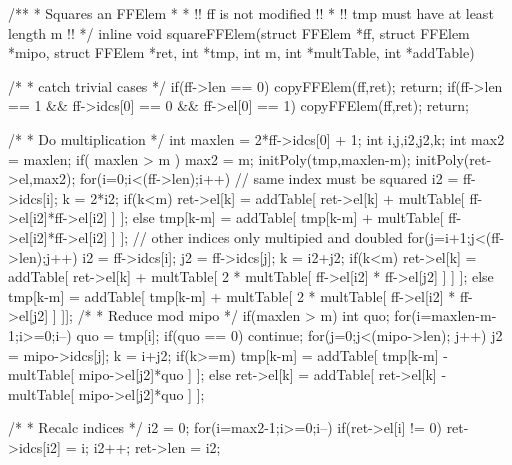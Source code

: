 \begin{ccode}[caption={Aus \url{../Sage/enumeratePCNs.c}},
  firstnumber=404]
/**
 * Squares an FFElem
 *
 * !! ff is not modified !!
 * !! tmp must have at least length m !!
 */
inline void squareFFElem(struct FFElem *ff, struct FFElem *mipo,
        struct FFElem *ret, int *tmp, int m,
        int *multTable, int *addTable){
    /* 
     * catch trivial cases
     */
    if(ff->len == 0){
        copyFFElem(ff,ret);
        return;
    }
    if(ff->len == 1 && ff->idcs[0] == 0 && ff->el[0] == 1){
        copyFFElem(ff,ret);
        return;
    }

    /*
     * Do multiplication
     */
    int maxlen = 2*ff->idcs[0] + 1;
    int i,j,i2,j2,k;
    int max2 = maxlen;
    if( maxlen > m ){
        max2 = m;
        initPoly(tmp,maxlen-m);
    }
    initPoly(ret->el,max2);
    for(i=0;i<(ff->len);i++){
        // same index must be squared
        i2 = ff->idcs[i];
        k = 2*i2;
        if(k<m){
            ret->el[k] = addTable[ ret->el[k] + 
                multTable[ ff->el[i2]*ff->el[i2] ] ];
        }else{
            tmp[k-m] = addTable[ tmp[k-m] +
                multTable[ ff->el[i2]*ff->el[i2] ] ];
        }
        // other indices only multipied and doubled
        for(j=i+1;j<(ff->len);j++){
            i2 = ff->idcs[i];
            j2 = ff->idcs[j];
            k = i2+j2;
            if(k<m){
                ret->el[k] = addTable[ ret->el[k] + 
                    multTable[ 2 * multTable[ ff->el[i2] * ff->el[j2] ] ] ];
            }else{
                tmp[k-m] = addTable[ tmp[k-m] +
                    multTable[ 2 * multTable[ ff->el[i2] * ff->el[j2] ] ]];
            }
        }
    }
    /*
     * Reduce mod mipo
     */
    if(maxlen > m){
        int quo;
        for(i=maxlen-m-1;i>=0;i--){
            quo = tmp[i];
            if(quo == 0) continue;
            for(j=0;j<(mipo->len); j++){
                j2 = mipo->idcs[j];
                k = i+j2;
                if(k>=m){
                    tmp[k-m] = addTable[ tmp[k-m] - 
                        multTable[ mipo->el[j2]*quo ] ];
                }else{
                    ret->el[k] = addTable[ ret->el[k] - 
                        multTable[ mipo->el[j2]*quo ] ];
                }
            }
        }
    }

    /*
     * Recalc indices
     */
    i2 = 0;
    for(i=max2-1;i>=0;i--){
        if(ret->el[i] != 0){
            ret->idcs[i2] = i;
            i2++;
        }
    }
    ret->len = i2;
}
\end{ccode}


